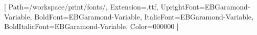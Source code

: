 \usepackage[paperwidth=6in,paperheight=9in,inner=0.875in,outer=0.625in,top=0.75in,bottom=0.875in,twoside]{geometry}
\providecommand{\tightlist}{\setlength{\itemsep}{0pt}\setlength{\parskip}{0pt}}
\setmainfont{EBGaramond}[
  Path=/workspace/print/fonts/,
  Extension=.ttf,
  UprightFont=EBGaramond-Variable,
  BoldFont=EBGaramond-Variable,
  ItalicFont=EBGaramond-Variable,
  BoldItalicFont=EBGaramond-Variable,
  Color=000000
]
